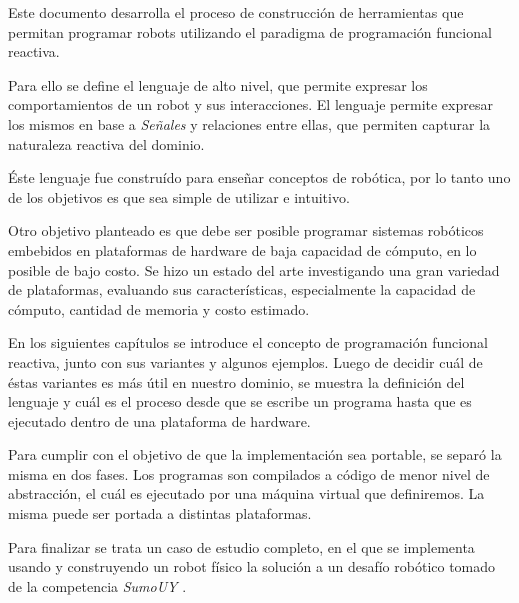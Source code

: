 

  Este documento desarrolla el proceso de construcción de
herramientas que permitan programar robots utilizando
el paradigma de programación funcional reactiva.

  Para ello se define el lenguaje \frob{} de alto nivel,
que permite expresar los comportamientos de un robot y sus
interacciones.
  El lenguaje permite expresar los mismos en base a
\emph{Señales} y relaciones entre ellas, que permiten
capturar la naturaleza reactiva del dominio.

  Éste lenguaje fue construído para
enseñar conceptos de robótica, por lo tanto
uno de los objetivos es que sea simple de
utilizar e intuitivo.

  Otro objetivo planteado es que debe ser posible programar
sistemas robóticos embebidos en plataformas de
hardware de baja capacidad de cómputo, en lo posible de
bajo costo.
  Se hizo un estado del arte investigando una gran variedad
de plataformas, evaluando sus características,
especialmente la capacidad de cómputo, cantidad de memoria y
costo estimado.

  En los siguientes capítulos se introduce el concepto de
programación funcional reactiva, junto con sus variantes y
algunos ejemplos.
  Luego de decidir cuál de éstas variantes es más útil
en nuestro dominio, se muestra la definición del lenguaje
\frob{} y cuál es el proceso desde que se escribe un programa
hasta que es ejecutado dentro de una plataforma de hardware.

  Para cumplir con el objetivo de que la implementación sea
portable, se separó la misma en dos fases. Los programas son
compilados a código \alf{} de menor nivel de abstracción,
el cuál es ejecutado por una máquina virtual que definiremos.
  La misma puede ser portada a distintas plataformas.

  Para finalizar se trata un caso de estudio completo, en el
que se implementa usando \frob{} y construyendo un robot físico
la solución a un desafío robótico tomado de la
competencia \textit{SumoUY} \cite{sumouy}.

